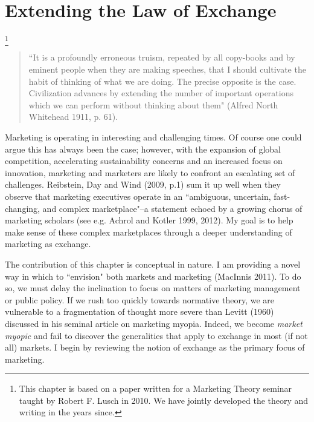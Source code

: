 \chapter{Extending the Law of Exchange\label{law}}\footnote{This chapter is based on a paper written for a Marketing Theory seminar taught by Robert F. Lusch in 2010. We have jointly developed the theory and writing in the years since.}

\begin{small}
\begin{quote}
``It is a profoundly erroneous truism, repeated by all copy-books and by eminent people when they are making speeches, that I should cultivate the habit of thinking of what we are doing. The precise opposite is the case. Civilization advances by extending the number of important operations which we can perform without thinking about them"	
(Alfred North Whitehead 1911, p. 61).
\end{quote}
\end{small}

Marketing is operating in interesting and challenging times. Of course one could argue this has always been the case; however, with the expansion of global competition, accelerating sustainability concerns and an increased focus on innovation, marketing and marketers are likely to confront an escalating set of challenges. Reibstein, Day and Wind (2009, p.1) sum it up well when they observe that marketing executives operate in an ``ambiguous, uncertain, fast-changing, and complex marketplace"--a statement echoed by a growing chorus of marketing scholars (see e.g. Achrol and Kotler 1999, 2012). My goal is to help make sense of these complex marketplaces through a deeper understanding of marketing as exchange. 

The contribution of this chapter is conceptual in nature. I am providing a novel way in which to ``envision" both markets and marketing (MacInnis 2011). To do so, we must delay the inclination to focus on matters of marketing management or public policy. If we rush too quickly towards normative theory, we are vulnerable to a fragmentation of thought more severe than Levitt (1960) discussed in his seminal article on marketing myopia. Indeed, we become \emph{market myopic} and fail to discover the generalities that apply to exchange in most (if not all) markets. I begin by reviewing the notion of exchange as the primary focus of marketing. 

